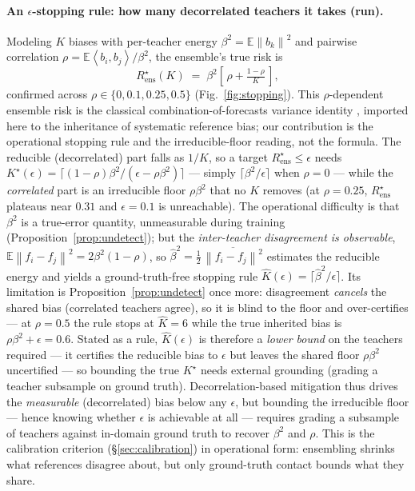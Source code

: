 \documentclass[10pt]{article} %
\theoremstyle{plain}
\theoremstyle{remark}
\newcommand{\E}{\mathbb{E}}
\newcommand{\norm}[1]{\left\lVert #1 \right\rVert}
\newcommand{\inner}[2]{\left\langle #1, #2 \right\rangle}
\begin{document}
\paragraph{An $\epsilon$-stopping rule: how many decorrelated teachers it takes (run).} Modeling $K$ biases with per-teacher energy $\beta^2=\E\norm{b_k}^2$ and pairwise correlation $\rho=\E\inner{b_i}{b_j}/\beta^2$, the ensemble's true risk is
\[
R^\star_{\mathrm{ens}}(K) \;=\; \beta^2\!\left[\,\rho + \tfrac{1-\rho}{K}\,\right],
\]
confirmed across $\rho\in\{0,0.1,0.25,0.5\}$ (Fig.~\ref{fig:stopping}). This $\rho$-dependent ensemble risk is the classical combination-of-forecasts variance identity \citep{bates1969}, imported here to the inheritance of systematic reference bias; our contribution is the operational stopping rule and the irreducible-floor reading, not the formula. The reducible (decorrelated) part falls as $1/K$, so a target $R^\star_{\mathrm{ens}}\le\epsilon$ needs $K^\star(\epsilon)=\lceil(1-\rho)\beta^2/(\epsilon-\rho\beta^2)\rceil$ --- simply $\lceil\beta^2/\epsilon\rceil$ when $\rho=0$ --- while the \emph{correlated} part is an irreducible floor $\rho\beta^2$ that no $K$ removes (at $\rho=0.25$, $R^\star_{\mathrm{ens}}$ plateaus near $0.31$ and $\epsilon=0.1$ is unreachable). The operational difficulty is that $\beta^2$ is a true-error quantity, unmeasurable during training (Proposition~\ref{prop:undetect}); but the \emph{inter-teacher disagreement is observable}, $\E\norm{f_i-f_j}^2=2\beta^2(1-\rho)$, so $\hat\beta^2=\tfrac12\,\overline{\norm{f_i-f_j}^2}$ estimates the reducible energy and yields a ground-truth-free stopping rule $\hat K(\epsilon)=\lceil\hat\beta^2/\epsilon\rceil$. Its limitation is Proposition~\ref{prop:undetect} once more: disagreement \emph{cancels} the shared bias (correlated teachers agree), so it is blind to the floor and over-certifies --- at $\rho=0.5$ the rule stops at $\hat K=6$ while the true inherited bias is $\rho\beta^2+\epsilon=0.6$. Stated as a rule, $\hat K(\epsilon)$ is therefore a \emph{lower bound} on the teachers required --- it certifies the reducible bias to $\epsilon$ but leaves the shared floor $\rho\beta^2$ uncertified --- so bounding the true $K^\star$ needs external grounding (grading a teacher subsample on ground truth). Decorrelation-based mitigation thus drives the \emph{measurable} (decorrelated) bias below any $\epsilon$, but bounding the irreducible floor --- hence knowing whether $\epsilon$ is achievable at all --- requires grading a subsample of teachers against in-domain ground truth to recover $\beta^2$ and $\rho$. This is the calibration criterion (\S\ref{sec:calibration}) in operational form: ensembling shrinks what references disagree about, but only ground-truth contact bounds what they share.
\end{document}
